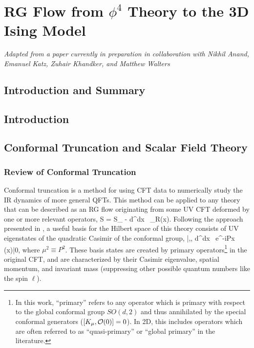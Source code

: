 \chapter{RG Flow from $\phi^4$ Theory to the 3D Ising Model}
\label{chap:truncation}

\emph{Adapted from a paper currently in preparation in collaboration with 
Nikhil Anand, Emanuel Katz, Zuhair Khandker, and Matthew Walters}

\section{Introduction and Summary}

\section{Introduction}
\label{sec:Intro}




\section{Conformal Truncation and Scalar Field Theory}
\label{sec:Model}




\subsection{Review of Conformal Truncation}

Conformal truncation is a method for using CFT data to numerically study the IR 
dynamics of more general QFTs. This method can be applied to any theory that can 
be described as an RG flow originating from some UV CFT deformed by one or more 
relevant operators,
\be
S = S_{\CFT} - \lambda \int d^dx \, \Ocal_R(x).
\ee
Following the approach presented in \cite{Truncation}, a useful basis for the 
Hilbert space of this theory consists of UV eigenstates of the quadratic Casimir 
of the conformal group,
\be
|\Ccal,,\mu\> \equiv \int d^dx \, e^{-iP\cdot x} \Ocal(x)|0\>,
\label{eq:basis}
\ee
where $\mu^2 \equiv P^2$. These basis states are created by primary 
operators\footnote{In this work, ``primary'' refers to any operator which is 
primary with respect to the global conformal group $SO(d,2)$ and thus 
annihilated by the special conformal generators ($[K_\mu,{\cal O}(0)] = 0$). 
In 2D, this includes operators which are often referred to as ``quasi-primary'' 
or ``global primary'' in the literature.} in the original CFT, and are 
characterized by their Casimir eigenvalue, spatial momentum, and invariant mass 
(suppressing other possible quantum numbers like the spin $\ell$). 


